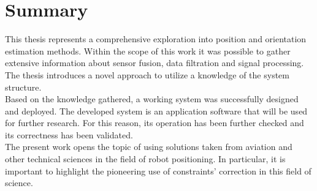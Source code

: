 \chapter{Summary}

This thesis represents a comprehensive exploration into position and orientation estimation methods. Within the scope of this work it was possible to gather extensive information about sensor fusion, data filtration and signal processing. The thesis introduces a novel approach to utilize a knowledge of the system structure.\\

Based on the knowledge gathered, a working system was successfully designed and deployed. The developed system is an application software that will be used for further research. For this reason, its operation has been further checked and its correctness has been validated.\\

The present work opens the topic of using solutions taken from aviation and other technical sciences in the field of robot positioning. In particular, it is important to highlight the pioneering use of constraints' correction in this field of science.




